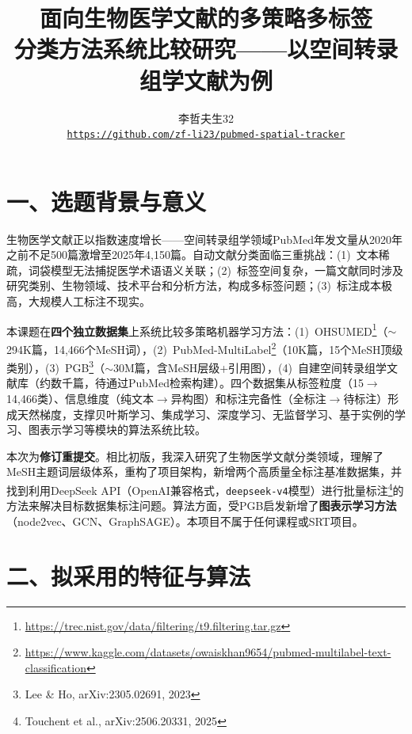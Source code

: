 \documentclass[12pt,a4paper]{ctexart}
\begin{document}
\title{\vspace{-1.2cm}\textbf{面向生物医学文献的多策略多标签\\[1pt]分类方法系统比较研究——以空间转录组学文献为例}}
\author{李哲夫\quad 生32\\[1pt]
\texttt{\footnotesize\url{https://github.com/zf-li23/pubmed-spatial-tracker}}}
\date{}
\maketitle
\vspace{-1.0cm}

\section{一、选题背景与意义}

生物医学文献正以指数速度增长——空间转录组学领域PubMed年发文量从2020年之前不足500篇激增至2025年4,150篇。自动文献分类面临三重挑战：(1)~文本稀疏，词袋模型无法捕捉医学术语语义关联；(2)~标签空间复杂，一篇文献同时涉及研究类别、生物领域、技术平台和分析方法，构成多标签问题；(3)~标注成本极高，大规模人工标注不现实。

本课题在\textbf{四个独立数据集}上系统比较多策略机器学习方法：(1)~OHSUMED\footnote{\url{https://trec.nist.gov/data/filtering/t9.filtering.tar.gz}}（$\sim$294K篇，14,466个MeSH词），(2)~PubMed-MultiLabel\footnote{\url{https://www.kaggle.com/datasets/owaiskhan9654/pubmed-multilabel-text-classification}}（10K篇，15个MeSH顶级类别），(3)~PGB\footnote{Lee \& Ho, arXiv:2305.02691, 2023}（$\sim$30M篇，含MeSH层级+引用图），(4)~自建空间转录组学文献库（约数千篇，待通过PubMed检索构建）。四个数据集从标签粒度（15$\to$14,466类）、信息维度（纯文本$\to$异构图）和标注完备性（全标注$\to$待标注）形成天然梯度，支撑贝叶斯学习、集成学习、深度学习、无监督学习、基于实例的学习、图表示学习等模块的算法系统比较。

本次为\textbf{修订重提交}。相比初版，我深入研究了生物医学文献分类领域，理解了MeSH主题词层级体系，重构了项目架构，新增两个高质量全标注基准数据集，并找到利用DeepSeek API（OpenAI兼容格式，\texttt{deepseek-v4}模型）进行批量标注\footnote{Touchent et al., arXiv:2506.20331, 2025}的方法来解决目标数据集标注问题。算法方面，受PGB启发新增了\textbf{图表示学习方法}（node2vec、GCN、GraphSAGE）。本项目不属于任何课程或SRT项目。

\section{二、拟采用的特征与算法}
\end{document}

